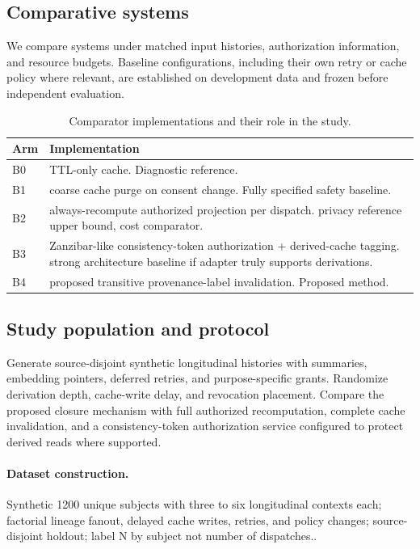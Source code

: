 \documentclass[11pt,a4paper]{article}
\begin{document}
\subsection{Comparative systems}
We compare systems under matched input histories, authorization information, and resource budgets. Baseline configurations, including their own retry or cache policy where relevant, are established on development data and frozen before independent evaluation.
\begin{table}[ht]
\centering\footnotesize
\caption{Comparator implementations and their role in the study.}
\begin{tabularx}{\linewidth}{@{}lX@{}}\toprule
Arm & Implementation \\ \midrule
B0 & TTL-only cache. Diagnostic reference. \\ 
B1 & coarse cache purge on consent change. Fully specified safety baseline. \\ 
B2 & always-recompute authorized projection per dispatch. privacy reference upper bound, cost comparator. \\ 
B3 & Zanzibar-like consistency-token authorization + derived-cache tagging. strong architecture baseline if adapter truly supports derivations. \\ 
B4 & proposed transitive provenance-label invalidation. Proposed method. \\ 
\bottomrule\end{tabularx}
\end{table}

\subsection{Study population and protocol}
Generate source-disjoint synthetic longitudinal histories with summaries, embedding pointers, deferred retries, and purpose-specific grants. Randomize derivation depth, cache-write delay, and revocation placement. Compare the proposed closure mechanism with full authorized recomputation, complete cache invalidation, and a consistency-token authorization service configured to protect derived reads where supported.

\paragraph{Dataset construction.} Synthetic 1200 unique subjects with three to six longitudinal contexts each; factorial lineage fanout, delayed cache writes, retries, and policy changes; source-disjoint holdout; label N by subject not number of dispatches..
\end{document}
